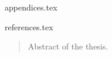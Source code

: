 \documentclass[a4paper,11px]{article}
\begin{document}
\newpage



{appendices.tex}

\newpage




{references.tex}

\newpage



\begin{latin}
\begin{abstract}
Abstract of the thesis.
\end{abstract}
\end{latin}
\newpage
\end{document}
